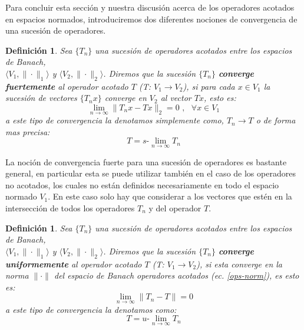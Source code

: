 \documentclass[12pt]{book}
\numberwithin{equation}{chapter}
\newtheorem{definition}[theorem]{Definici\'on}
\def\la{\langle}
\def\ra{\rangle}
\def\rar{\rightarrow}
\def\slim{s\mbox{-}\lim}
\def\ulim{u\mbox{-}\lim}
\begin{document}
\vspace{5 mm}

Para concluir esta secci\'on y nuestra discusi\'on acerca de los operadores acotados en espacios normados, introduciremos dos diferentes nociones de convergencia de una sucesi\'on de operadores.

\begin{definition}
Sea $\{ T_{n} \}$ una sucesi\'on de operadores acotados entre los espacios de Banach,\\ $\la V_{1},\| \cdot \|_{1} \ra $ y $ \la V_{2},\| \cdot \|_{2} \ra $. Diremos que la sucesi\'on $\{ T_{n} \}$ {\bf converge fuertemente} al operador acotado $T$ (T: $ V_{1} \rar V_{2} $), si para cada $x \in V_{1}$ la sucesi\'on de vectores $\{ T_{n}x \}$ converge en $V_{2}$ al vector $Tx$, esto es:
\begin{equation}\label{s-conv}
\lim_{n \rar \infty} \| T_{n}x - Tx \|_{2} =0 \,\,,\,\,\,\, \forall x \in V_{1}
\end{equation}
a este tipo de convergencia la denotamos simplemente como, $T_{n} \rar T$ o de forma mas precisa:
\begin{equation}\label{s-lim}
T = \slim_{n \rar \infty} T_{n}
\end{equation}
\end{definition}

\vspace{3 mm}

La noci\'on de convergencia fuerte para una sucesi\'on de operadores es bastante general, en particular esta se puede utilizar tambi\'en en el caso de los operadores no acotados, los cuales no est\'an definidos necesariamente en todo el espacio normado $V_{1}$. En este caso solo hay que considerar a los vectores que est\'en  en la intersecci\'on de todos los operadores $T_{n}$ y del operador $T$.

\begin{definition}
Sea $\{ T_{n} \}$ una sucesi\'on de operadores acotados entre los espacios de Banach,\\ $\la V_{1},\| \cdot \|_{1} \ra $ y $ \la V_{2},\| \cdot \|_{2} \ra $. Diremos que la sucesi\'on $\{ T_{n} \}$ {\bf converge uniformemente} al operador acotado $T$ (T: $ V_{1} \rar V_{2} $), si esta converge en la norma $\| \cdot \|$ del espacio de Banach operadores acotados (ec. \eqref{ops-norm}), es esto es:
\begin{equation}
\lim_{n \rar \infty} \| T_{n} - T \| =0 
\end{equation}
a este tipo de convergencia la denotamos como:
\begin{equation}
T= \ulim_{n \rar \infty} T_{n} 
\end{equation}
\end{definition}  
\end{document}
